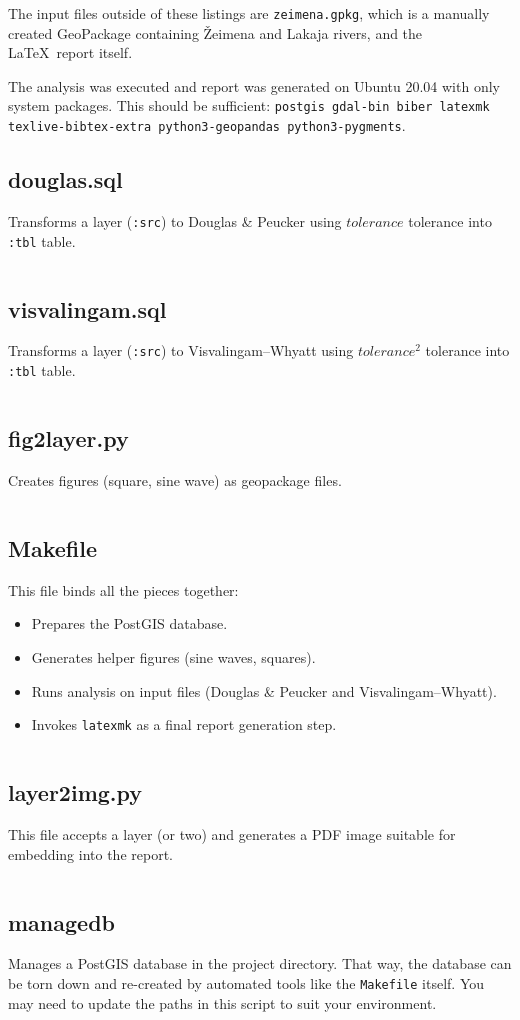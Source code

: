 \documentclass[a4paper]{article}
\newcommand{\DP}{Douglas \& Peucker}
\newcommand{\VW}{Visvalingam--Whyatt}
\begin{document}
\begin{appendices}
The input files outside of these listings are {\tt zeimena.gpkg}, which is a
manually created GeoPackage containing Žeimena and Lakaja rivers, and the
\LaTeX\ report itself.

The analysis was executed and report was generated on Ubuntu 20.04 with only
system packages. This should be sufficient: {\tt postgis gdal-bin biber
latexmk texlive-bibtex-extra python3-geopandas python3-pygments}.

\subsection{douglas.sql}
Transforms a layer ({\tt :src}) to {\DP} using $tolerance$ tolerance into
{\tt :tbl} table.
\inputminted[fontsize=\small]{sql}{douglas.sql}

\subsection{visvalingam.sql}
Transforms a layer ({\tt :src}) to {\VW} using $tolerance^2$ tolerance into
{\tt :tbl} table.
\inputminted[fontsize=\small]{sql}{visvalingam.sql}

\subsection{fig2layer.py}
Creates figures (square, sine wave) as geopackage files.
\inputminted[fontsize=\small]{python}{fig2layer.py}

\subsection{Makefile}
This file binds all the pieces together:
\begin{itemize}
    \item Prepares the PostGIS database.
    \item Generates helper figures (sine waves, squares).
    \item Runs analysis on input files ({\DP} and {\VW}).
    \item Invokes {\tt latexmk} as a final report generation step.
\end{itemize}
\inputminted[fontsize=\small]{make}{Makefile}

\subsection{layer2img.py}
This file accepts a layer (or two) and generates a PDF image suitable for embedding into the report.
\inputminted[fontsize=\small]{python}{layer2img.py}

\subsection{managedb}
Manages a PostGIS database in the project directory. That way, the database can
be torn down and re-created by automated tools like the {\tt Makefile} itself.
You may need to update the paths in this script to suit your environment.
\inputminted[fontsize=\small]{bash}{managedb}

\end{appendices}
\end{document}
